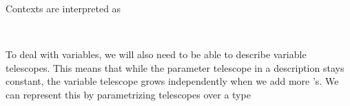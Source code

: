 Contexts are interpreted as
\begin{code}[hide]%
%
\>[2]\AgdaSpace{}%
%
\>[11]\AgdaSpace{}%
\AgdaSymbol{=}\AgdaSpace{}%
\<%
\\
%
\>[2]\AgdaSpace{}%
\AgdaSpace{}%
\AgdaSpace{}%
%
\>[11]\AgdaSpace{}%
\AgdaSymbol{=}\AgdaSpace{}%
\AgdaSpace{}%
\AgdaSpace{}%
\AgdaSpace{}%
\AgdaSpace{}%
\<%
\end{code}
To deal with variables, we will also need to be able to describe variable telescopes. This means that while the parameter telescope in a description stays constant, the variable telescope grows independently when we add more 's. We can represent this by parametrizing telescopes over a type
\begin{code}[hide]%
\>[0]\AgdaSpace{}%
\AgdaSpace{}%
\<%
\\
\>[0][@{}l@{\AgdaIndent{0}}]%
\>[2]\AgdaSpace{}%
\<%
\\
\>[2][@{}l@{\AgdaIndent{0}}]%
\>[4]\AgdaSpace{}%
\AgdaSymbol{:}\AgdaSpace{}%
\<%
\\
%
\>[4]\AgdaSpace{}%
\AgdaSymbol{:}\AgdaSpace{}%
\<%
\end{code}
